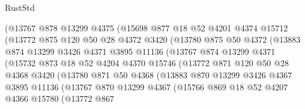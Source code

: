 \begin{lexlean}{RustStd}
\begin{coremodule}
                  (@13767
                    @878
                    @13299
                    @4375
                    (@15698
                      @877
                      @18
                      @52
                      @4201
                      @4374
                      @15712
                      (@13772
                        @875
                        @120
                        @50
                        @28
                        @4372
                        @3420
                        (@13780
                          @875
                          @50
                          @4372
                          (@13883
                            @874
                            @13299
                            @3426
                            @4371
                            @3895
                            @11136
                            (@13767
                              @874
                              @13299
                              @4371
                              (@15732
                                @873
                                @18
                                @52
                                @4204
                                @4370
                                @15746
                                (@13772
                                  @871
                                  @120
                                  @50
                                  @28
                                  @4368
                                  @3420
                                  (@13780
                                    @871
                                    @50
                                    @4368
                                    (@13883
                                      @870
                                      @13299
                                      @3426
                                      @4367
                                      @3895
                                      @11136
                                      (@13767
                                        @870
                                        @13299
                                        @4367
                                        (@15766
                                          @869
                                          @18
                                          @52
                                          @4207
                                          @4366
                                          @15780
                                          (@13772
                                            @867

\end{coremodule}
\end{lexlean}
